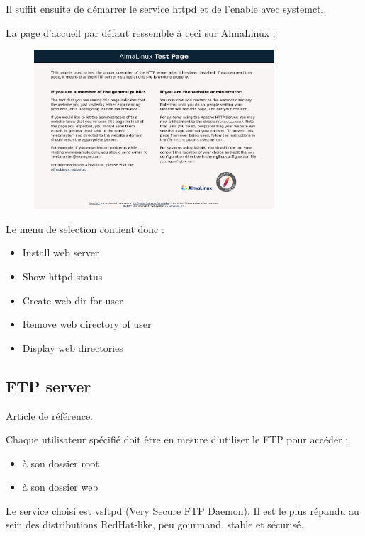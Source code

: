 \documentclass{article}
\begin{document}
	Il suffit ensuite de démarrer le service httpd et de l'enable avec systemctl.
	
	La page d'accueil par défaut ressemble à ceci sur AlmaLinux :
		\begin{figure}[h]
		\centering
		\includegraphics[width=0.8\textwidth]{webservdefault.png}
		
		\label{fig:your_label}
	\end{figure}
	
	Le menu de selection contient donc :
	\begin{itemize}
		\item Install web server
		\item Show httpd status
		\item Create web dir for user
		\item Remove web directory of user
		\item Display web directories
	\end{itemize}
	
	\newpage
	
	
	\subsection{FTP server}
	
	\href{https://doc.fedora-fr.org/wiki/Vsftpd_:_Installation_et_configuration}{Article de référence}.

	Chaque utilisateur spécifié doit être en mesure d'utiliser le FTP pour accéder :
	\begin{itemize}
		\item à son dossier root
		\item à son dossier web
	\end{itemize}
	
	Le service choisi est vsftpd (Very Secure FTP Daemon). Il est le plus répandu au sein des distributions RedHat-like, peu gourmand, stable et sécurisé.
	
\end{document}
